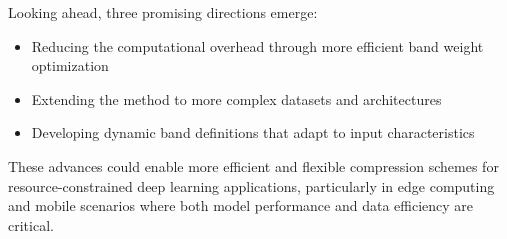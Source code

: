 \documentclass{article} %
\begin{document}
Looking ahead, three promising directions emerge:
\begin{itemize}
    \item Reducing the computational overhead through more efficient band weight optimization
    \item Extending the method to more complex datasets and architectures
    \item Developing dynamic band definitions that adapt to input characteristics
\end{itemize}

These advances could enable more efficient and flexible compression schemes for resource-constrained deep learning applications, particularly in edge computing and mobile scenarios where both model performance and data efficiency are critical.



\end{document}
